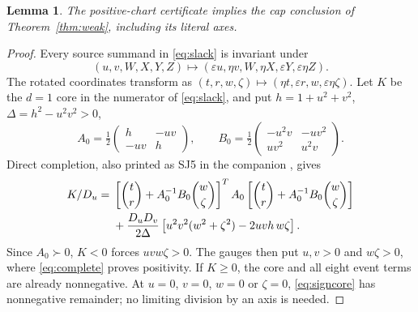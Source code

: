 \documentclass[10pt]{article}
\newtheorem{lemma}{Lemma}
\newcommand{\half}{\tfrac12}
\begin{document}
\begin{lemma}\label{lem:sign}
The positive-chart certificate implies the cap conclusion of
Theorem~\ref{thm:weak}, including its literal axes.
\end{lemma}
\begin{proof}
Every source summand in \eqref{eq:slack} is invariant under
\[
 (u,v,W,X,Y,Z)\longmapsto
 (\varepsilon u,\eta v,W,\eta X,\varepsilon Y,\varepsilon\eta Z).
\]
The rotated coordinates transform as
$(t,r,w,\zeta)\mapsto(\eta t,\varepsilon r,w,\varepsilon\eta\zeta)$.
Let $K$ be the $d=1$ core in the numerator of \eqref{eq:slack},
and put $h=1+u^2+v^2$, $\Delta=h^2-u^2v^2>0$,
\[
 A_0=\half\begin{pmatrix}h&-uv\\-uv&h\end{pmatrix},\qquad
 B_0=\half\begin{pmatrix}-u^2v&-uv^2\\uv^2&u^2v\end{pmatrix}.
\]
Direct completion, also printed as SJ5 in the companion
\cite{companion}, gives
\begin{align}
 K/D_u={}&\left[\binom tr+A_0^{-1}B_0\binom w\zeta\right]^TA_0
 \left[\binom tr+A_0^{-1}B_0\binom w\zeta\right] \notag\\
 &+\frac{D_uD_v}{2\Delta}
 \left[u^2v^2(w^2+\zeta^2)-2uvh\,w\zeta\right].
 \label{eq:signcore}
\end{align}
Since $A_0\succ0$, $K<0$ forces $uvw\zeta>0$. The gauges then put
$u,v>0$ and $w\zeta>0$, where \eqref{eq:complete} proves positivity.
If $K\geq0$, the core and all eight event terms are already nonnegative.
At $u=0$, $v=0$, $w=0$ or $\zeta=0$, \eqref{eq:signcore} has
nonnegative remainder; no limiting division by an axis is needed.
\end{proof}
\end{document}
